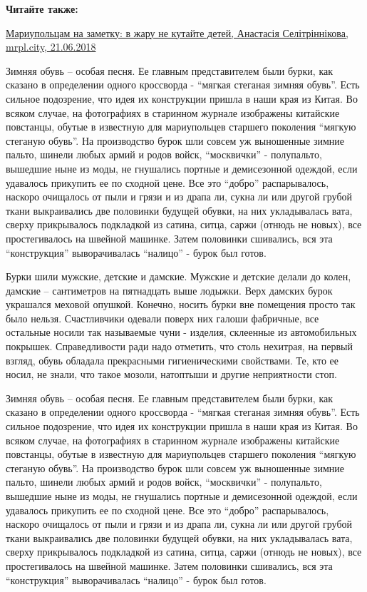 \textbf{Читайте также:} 

\href{https://mrpl.city/news/view/mariupoltsam-na-zametku-vremya-razdevat-detej}{%
Мариупольцам на заметку: в жару не кутайте детей, Анастасія Селітріннікова, mrpl.city, 21.06.2018}


Зимняя обувь – особая песня. Ее главным представителем были бурки, как сказано
в определении одного кроссворда - \enquote{мягкая стеганая зимняя обувь}. Есть сильное
подозрение, что идея их конструкции пришла в наши края из Китая. Во всяком
случае, на фотографиях в старинном журнале изображены китайские повстанцы,
обутые в известную для мариупольцев старшего поколения \enquote{мягкую стеганую обувь}.
На производство бурок шли совсем уж выношенные зимние пальто, шинели любых
армий и родов войск, \enquote{москвички} - полупальто, вышедшие ныне из моды, не
гнушались портные и демисезонной одеждой, если удавалось прикупить ее по
сходной цене. Все это \enquote{добро} распарывалось, наскоро очищалось от пыли и грязи
и из драпа ли, сукна ли или другой грубой ткани выкраивались две половинки
будущей обувки, на них укладывалась вата, сверху прикрывалось подкладкой из
сатина, ситца, саржи (отнюдь не новых), все простегивалось на швейной машинке.
Затем половинки сшивались, вся эта \enquote{конструкция} выворачивалась \enquote{налицо} -
бурок был готов.

Бурки шили мужские, детские и дамские. Мужские и детские делали до колен,
дамские – сантиметров на пятнадцать выше лодыжки. Верх дамских бурок украшался
меховой опушкой. Конечно, носить бурки вне помещения просто так было нельзя.
Счастливчики одевали поверх них галоши фабричные, все остальные носили так
называемые чуни - изделия, склеенные из автомобильных покрышек. Справедливости
ради надо отметить, что столь нехитрая, на первый взгляд, обувь обладала
прекрасными гигиеническими свойствами. Те, кто ее носил, не знали, что такое
мозоли, натоптыши и другие неприятности стоп.

Зимняя обувь – особая песня. Ее главным представителем были бурки, как сказано
в определении одного кроссворда - \enquote{мягкая стеганая зимняя обувь}. Есть
сильное подозрение, что идея их конструкции пришла в наши края из Китая. Во
всяком случае, на фотографиях в старинном журнале изображены китайские
повстанцы, обутые в известную для мариупольцев старшего поколения
\enquote{мягкую стеганую обувь}.  На производство бурок шли совсем уж
выношенные зимние пальто, шинели любых армий и родов войск, \enquote{москвички}
- полупальто, вышедшие ныне из моды, не гнушались портные и демисезонной
одеждой, если удавалось прикупить ее по сходной цене. Все это \enquote{добро}
распарывалось, наскоро очищалось от пыли и грязи и из драпа ли, сукна ли или
другой грубой ткани выкраивались две половинки будущей обувки, на них
укладывалась вата, сверху прикрывалось подкладкой из сатина, ситца, саржи
(отнюдь не новых), все простегивалось на швейной машинке.  Затем половинки
сшивались, вся эта \enquote{конструкция} выворачивалась \enquote{налицо} -
бурок был готов.

